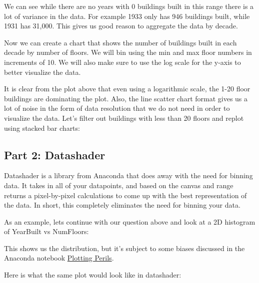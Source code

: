 \documentclass[11pt]{article}
\begin{document}
    We can see while there are no years with 0 buildings built in this range
there is a lot of variance in the data. For example 1933 only has 946
buildings built, while 1931 has 31,000. This gives us good reason to
aggregate the data by decade.

Now we can create a chart that shows the number of buildings built in
each decade by number of floors. We will bin using the min and max floor
numbers in increments of 10. We will also make sure to use the log scale
for the y-axis to better visualize the data.

    
    
    It is clear from the plot above that even using a logarithmic scale, the
1-20 floor buildings are dominating the plot. Also, the line scatter
chart format gives us a lot of noise in the form of data resolution that
we do not need in order to visualize the data. Let's filter out
buildings with less than 20 floors and replot using stacked bar charts:

    
    
    \hypertarget{part-2-datashader}{%
\subsection{Part 2: Datashader}\label{part-2-datashader}}

Datashader is a library from Anaconda that does away with the need for
binning data. It takes in all of your datapoints, and based on the
canvas and range returns a pixel-by-pixel calculations to come up with
the best representation of the data. In short, this completely
eliminates the need for binning your data.

As an example, lets continue with our question above and look at a 2D
histogram of YearBuilt vs NumFloors:

    
    
    This shows us the distribution, but it's subject to some biases
discussed in the Anaconda notebook
\href{https://anaconda.org/jbednar/plotting_pitfalls/notebook}{Plotting
Perils}.

Here is what the same plot would look like in datashader:
 
            
    
    \begin{center}
    \end{center}
    { \hspace*{\fill} \\}
    
\end{document}
